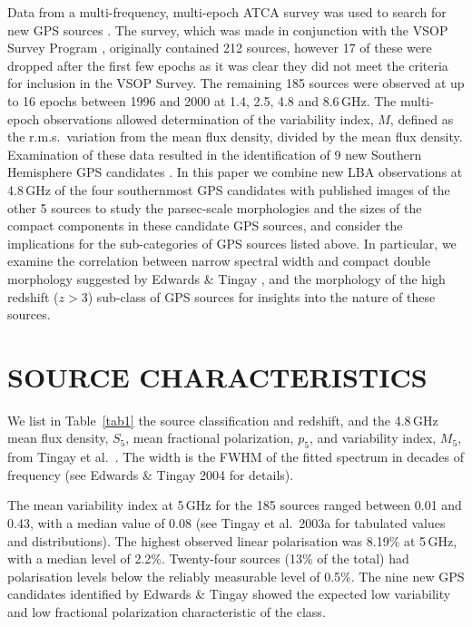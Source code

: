 \documentclass{pasa}%
\begin{document}
Data from a multi-frequency, multi-epoch ATCA survey \cite{tin03a} was
used to search for new GPS sources \cite{tin03b,edw04}.  The survey,
which was made in conjunction with the VSOP Survey Program
\cite{hir00}, originally contained 212 sources, however 17 of these
were dropped after the first few epochs as it was clear they did not
meet the criteria for inclusion in the VSOP Survey.  The remaining 185
sources were observed at up to 16 epochs between 1996 and 2000 at 1.4,
2.5, 4.8 and 8.6\,GHz.  The multi-epoch observations allowed
determination of the variability index, $M$, 
defined as the r.m.s.\ variation from the mean flux density,
divided by the mean flux density. 
Examination of these data
resulted in the identification of 9 new Southern Hemisphere GPS
candidates \cite{tin03b,edw04}.  In this paper we combine new LBA
observations
at 4.8\,GHz
of the four southernmost GPS candidates with published
images of the other 5 sources to study the parsec-scale morphologies
and the sizes of the compact components in these candidate GPS
sources, and consider the implications for the sub-categories of GPS
sources listed above.
In particular, we examine the correlation between
narrow spectral width and compact double morphology suggested by
Edwards \& Tingay , and the morphology of
the high redshift ($z>$3) sub-class of GPS sources
for insights into the nature of these sources.


\section{SOURCE CHARACTERISTICS}

We list in Table~\ref{tab1} the source classification and redshift,
and the 4.8\,GHz mean flux density, $S_5$, mean fractional
polarization, $p_5$, and variability index, $M_5$, 
from Tingay et al.\ .  The width is the
FWHM of the fitted spectrum in decades of frequency (see Edwards \&
Tingay 2004 for details).

The mean variability index at 5\,GHz for the 185 sources ranged
between 0.01 and 0.43, with a median value of 0.08
(see Tingay et al.\
  2003a for tabulated values and distributions).
The highest
observed linear polarisation was 8.19\% at 5\,GHz, with a median level
of 2.2\%.  Twenty-four sources (13\% of the total) had polarisation
levels below the reliably measurable level of 0.5\%.  The nine new GPS
candidates identified by Edwards \& Tingay \shortcite{edw04}
showed the expected low variability and low fractional
polarization characteristic of the class.
\end{document}

